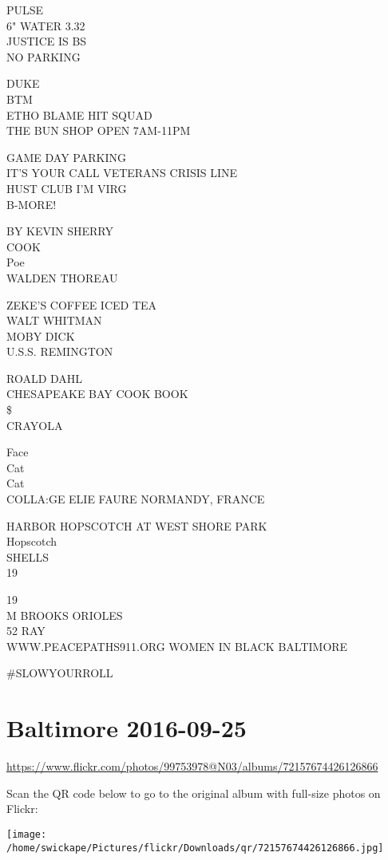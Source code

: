 \documentclass[10pt,letterpaper]{article}
\begin{document}
PULSE\\
6" WATER 3.32\\
JUSTICE IS BS\\
NO PARKING

DUKE\\
BTM\\
ETHO BLAME HIT SQUAD\\
THE BUN SHOP OPEN 7AM{-}11PM

GAME DAY PARKING\\
IT'S YOUR CALL VETERANS CRISIS LINE\\
HUST CLUB I'M VIRG\\
B{-}MORE!

BY KEVIN SHERRY\\
COOK\\
Poe\\
WALDEN THOREAU

ZEKE'S COFFEE ICED TEA\\
WALT WHITMAN\\
MOBY DICK\\
U.S.S. REMINGTON

ROALD DAHL\\
CHESAPEAKE BAY COOK BOOK\\
\$\\
CRAYOLA

Face\\
Cat\\
Cat\\
COLLA:GE ELIE FAURE NORMANDY, FRANCE

HARBOR HOPSCOTCH AT WEST SHORE PARK\\
Hopscotch\\
SHELLS\\
19

19\\
M BROOKS ORIOLES\\
52 RAY\\
WWW.PEACEPATHS911.ORG WOMEN IN BLACK BALTIMORE

\#SLOWYOURROLL


\section*{Baltimore 2016-09-25}

\url{https://www.flickr.com/photos/99753978@N03/albums/72157674426126866}

Scan the QR code below to go to the original album with full-size photos on Flickr:

\texttt{[image: /home/swickape/Pictures/flickr/Downloads/qr/72157674426126866.jpg]}
\end{document}
